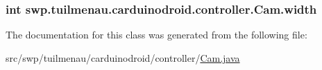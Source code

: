 \subsubsection[{width}]{\setlength{\rightskip}{0pt plus 5cm}int swp.\+tuilmenau.\+carduinodroid.\+controller.\+Cam.\+width}\label{classswp_1_1tuilmenau_1_1carduinodroid_1_1controller_1_1_cam_aceeda61bce71daa554b0c126c3da9fbd}


The documentation for this class was generated from the following file\+:\begin{DoxyCompactItemize}
\item 
src/swp/tuilmenau/carduinodroid/controller/\hyperlink{_cam_8java}{Cam.\+java}\end{DoxyCompactItemize}
